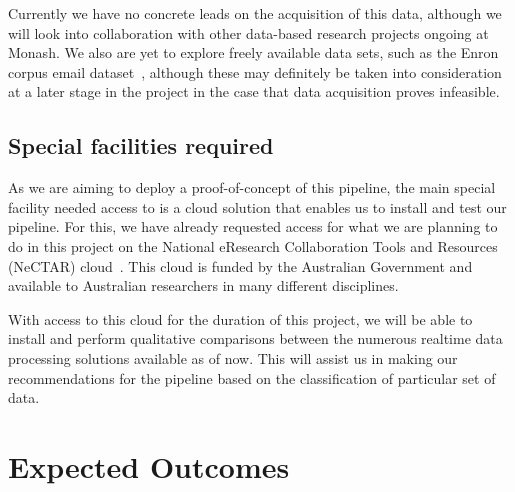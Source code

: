 \documentclass[a4paper,11pt]{article}
\begin{document}
Currently we have no concrete leads on the acquisition of this data, although we will look into collaboration with other
data-based research projects ongoing at Monash. We also are yet to explore freely available data sets, such as the Enron
corpus email dataset~\cite{klimt2004introducing}, although these may definitely be taken into
consideration at a later stage in the project in the case that data acquisition proves infeasible.


\subsection{Special facilities required} %
\label{sub:special_facilities_required}

As we are aiming to deploy a proof-of-concept of this pipeline, the main special facility needed access to is a cloud solution
that enables us to install and test our pipeline. For this, we have already requested access for what we are planning to do
in this project on the National eResearch Collaboration Tools and Resources (NeCTAR) cloud~\cite{web:Nectar}. This cloud
is funded by the Australian Government and available to Australian researchers in many different disciplines.

With
access to this cloud for the duration of this project, we will be able to install and perform qualitative comparisons
between the numerous realtime data processing solutions available as of now. This will assist us in making our recommendations
for the pipeline based on the classification of particular set of data.





\section{Expected Outcomes} %
\label{sec:expected_outcomes}



\newpage



\end{document}
